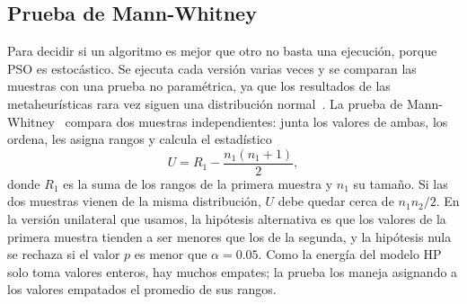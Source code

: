 \subsection{Prueba de Mann-Whitney}
\label{sec:mannwhitney}

Para decidir si un algoritmo es mejor que otro no basta una ejecución, porque PSO es estocástico. Se ejecuta cada versión varias veces y se comparan las muestras con una prueba no paramétrica, ya que los resultados de las metaheurísticas rara vez siguen una distribución normal~\cite{derrac2011practical}. La prueba de Mann-Whitney~\cite{mann1947test} compara dos muestras independientes: junta los valores de ambas, los ordena, les asigna rangos y calcula el estadístico
\begin{equation}
U = R_1 - \frac{n_1 (n_1 + 1)}{2},
\end{equation}
donde $R_1$ es la suma de los rangos de la primera muestra y $n_1$ su tamaño. Si las dos muestras vienen de la misma distribución, $U$ debe quedar cerca de $n_1 n_2 / 2$. En la versión unilateral que usamos, la hipótesis alternativa es que los valores de la primera muestra tienden a ser menores que los de la segunda, y la hipótesis nula se rechaza si el valor $p$ es menor que $\alpha = 0.05$. Como la energía del modelo HP solo toma valores enteros, hay muchos empates; la prueba los maneja asignando a los valores empatados el promedio de sus rangos.
